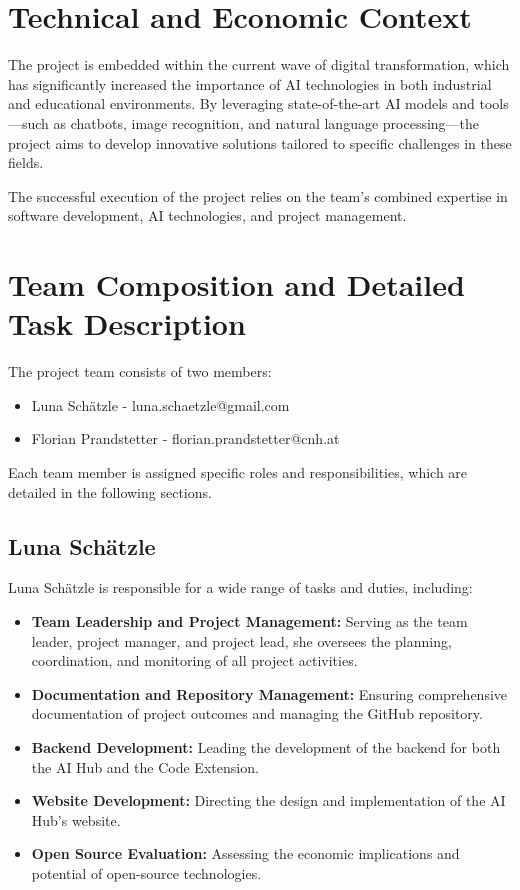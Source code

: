 \section{Technical and Economic Context}

The project is embedded within the current wave of digital transformation, which has significantly increased the importance of AI technologies in both industrial and educational environments. By leveraging state-of-the-art AI models and tools—such as chatbots, image recognition, and natural language processing—the project aims to develop innovative solutions tailored to specific challenges in these fields.

The successful execution of the project relies on the team’s combined expertise in software development, AI technologies, and project management.

\section{Team Composition and Detailed Task Description}

The project team consists of two members:
\begin{itemize}
    \item Luna Schätzle        - luna.schaetzle@gmail.com
    \item Florian Prandstetter  - florian.prandstetter@cnh.at
\end{itemize}

Each team member is assigned specific roles and responsibilities, which are detailed in the following sections.

\subsection{Luna Schätzle}

Luna Schätzle is responsible for a wide range of tasks and duties, including:
\begin{itemize}
    \item \textbf{Team Leadership and Project Management:} Serving as the team leader, project manager, and project lead, she oversees the planning, coordination, and monitoring of all project activities.
    \item \textbf{Documentation and Repository Management:} Ensuring comprehensive documentation of project outcomes and managing the GitHub repository.
    \item \textbf{Backend Development:} Leading the development of the backend for both the AI Hub and the Code Extension.
    \item \textbf{Website Development:} Directing the design and implementation of the AI Hub's website.
    \item \textbf{Open Source Evaluation:} Assessing the economic implications and potential of open-source technologies.
\end{itemize}

